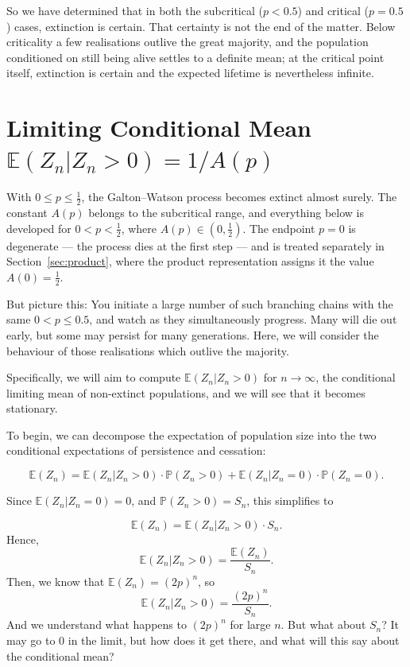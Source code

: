 \documentclass[11pt]{article}
\begin{document}
So we have determined that in both the subcritical ($p<0.5$) and critical ($p=0.5$) cases, extinction is certain. That certainty is not the end of the matter. Below criticality a few realisations outlive the great majority, and the population conditioned on still being alive settles to a definite mean; at the critical point itself, extinction is certain and the expected lifetime is nevertheless infinite.


\section{Limiting Conditional Mean \texorpdfstring{$\mathbb{E}(Z_n|Z_n>0) = 1/A(p)$}{E(Zn|Zn>0) = 1/A(p)}}
\label{sec:limcondmean}


With $0 \le p \le \tfrac12$, the Galton--Watson process becomes extinct almost surely. The constant $A(p)$ belongs to the subcritical range, and everything below is developed for $0<p<\tfrac12$, where $A(p)\in(0,\tfrac12)$. The endpoint $p=0$ is degenerate --- the process dies at the first step --- and is treated separately in Section~\ref{sec:product}, where the product representation assigns it the value $A(0)=\tfrac12$.

But picture this: You 
initiate a large number of such branching chains with the same $0<p\leq 0.5$, and watch as they simultaneously progress.
Many will die out early, but some may persist for many generations. Here, we will consider the behaviour of those realisations
which outlive the majority. 

Specifically, we will aim to compute $\mathbb{E}(Z_n|Z_n>0)$ for $n\to \infty$, the conditional limiting mean 
of non-extinct populations, and we will see that it becomes stationary.

\vspace{20pt}

\noindent
To begin, we can decompose the expectation of population size into the two conditional expectations of persistence and cessation: 

$$\mathbb{E}(Z_n) = \mathbb{E}(Z_n|Z_n>0)\cdot\mathbb{P}(Z_n>0) + \mathbb{E}(Z_n|Z_n=0)\cdot\mathbb{P}(Z_n=0).$$

\noindent
Since $\mathbb{E}(Z_n|Z_n=0) = 0$, and $\mathbb{P}(Z_n > 0) = S_n$, this simplifies to

$$\mathbb{E}(Z_n) = \mathbb{E}(Z_n|Z_n>0)\cdot S_n.$$
Hence,
$$\mathbb{E}(Z_n|Z_n>0) = \frac{\mathbb{E}(Z_n)}{S_n}.$$
Then, we know that $\mathbb{E}(Z_n) = (2p)^n$, so
$$\mathbb{E}(Z_n|Z_n>0) = \frac{(2p)^n}{S_n}.$$
And we understand what happens to $(2p)^n$ for large $n$. But what about $S_n$? It may go to 0 in the limit, but how does it get there, and what will this say about the conditional mean?
\end{document}
